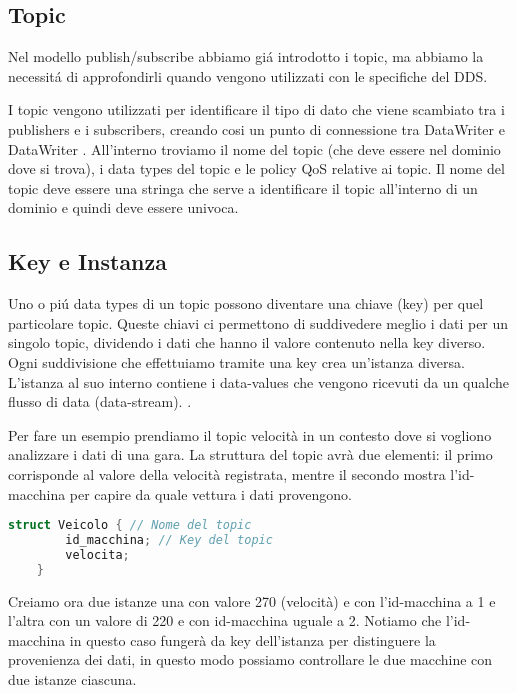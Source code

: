 \subsection{Topic}
Nel modello publish/subscribe abbiamo giá introdotto i topic, ma 
abbiamo la necessitá di approfondirli quando vengono utilizzati
con le specifiche del DDS.

I topic vengono utilizzati per identificare il tipo di dato che viene
scambiato tra i publishers e i subscribers, creando cosi un punto
di connessione 
tra DataWriter e DataWriter\cite{topicomg} .
All'interno troviamo il nome del topic
(che deve essere nel dominio dove si trova),
i data types del topic e le policy QoS relative ai topic.
Il nome del topic deve essere una stringa che serve 
a identificare il topic all'interno di un dominio e quindi deve essere
univoca.




\subsection{Key e Instanza}
Uno o piú data types di un topic possono diventare una chiave (key) per 
quel particolare topic. Queste chiavi ci permettono di suddivedere meglio
i dati per un singolo topic, dividendo i dati che hanno il valore contenuto
nella key diverso. Ogni suddivisione che effettuiamo tramite una key crea 
un'istanza diversa. L'istanza al suo interno contiene i data-values che 
vengono ricevuti da un qualche flusso di data (data-stream).
 \cite{Instance81:online}.

Per fare un esempio prendiamo il topic velocità in un contesto dove si
vogliono analizzare i dati di una gara.
La struttura del topic avrà due elementi: il primo corrisponde al valore
della velocità registrata, mentre il secondo mostra l'id-macchina per 
capire da quale vettura i dati provengono.
\begin{lstlisting}[language=C++, caption=Esempio di Topic con una key
    usando il linguaggio IDL
    , label=Topic struct]
    struct Veicolo { // Nome del topic
        id_macchina; // Key del topic
        velocita;
    }
    \end{lstlisting}
Creiamo ora due istanze una con valore 270 (velocità) e con 
l'id-macchina a 1 e l'altra con un valore di 220 e con id-macchina 
uguale a 2. Notiamo che l'id-macchina in questo caso fungerà da key 
dell'istanza per distinguere la provenienza dei dati, in questo
modo possiamo controllare le due macchine con due istanze ciascuna.

